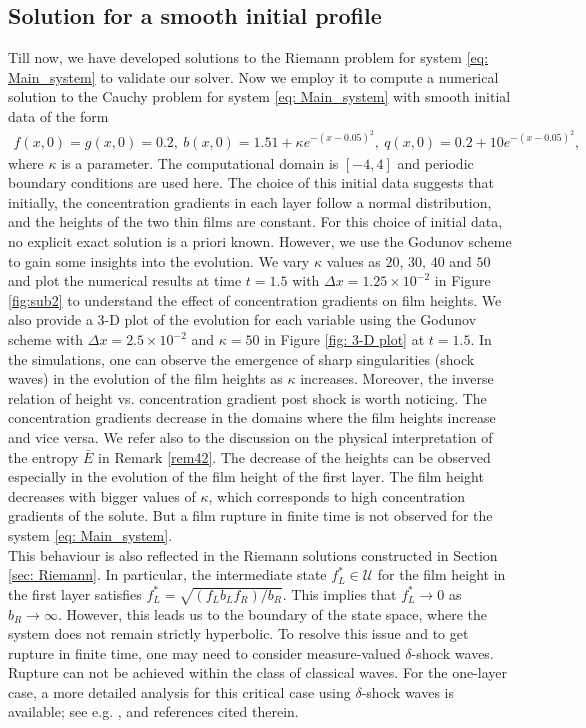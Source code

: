 \documentclass[11pt]{article}
\numberwithin{equation}{section}
\newtheorem{counter example}[theorem]{Counter Example}
\begin{document}
{\subsection{Solution for a smooth initial profile}
Till now, we have developed solutions to the Riemann problem for system \eqref{eq: Main_system} to validate our solver. Now we employ it to compute a numerical solution to the Cauchy problem for system \eqref{eq: Main_system} with smooth initial data of the form 
\begin{align*}
    f(x, 0)=g(x, 0)=0.2,~b(x, 0)=1.51+\kappa e^{-(x-0.05)^2},~q(x, 0)= 0.2+10e^{-(x-0.05)^2},
\end{align*}
where $\kappa$ is a parameter. 
The computational domain is $[-4, 4]$ and periodic boundary conditions are used here. The choice of this initial data suggests that initially, the concentration gradients in each layer follow a normal distribution, and the heights of the two thin films are constant. For this choice of initial data, no explicit exact solution is a priori known. However, we use the Godunov scheme to gain some insights into the evolution.  We vary $\kappa$ values as $20, \,30, \,40$ and $50$ and plot the numerical results at time $t=1.5$ with $\Delta x= 1.25\times 10^{-2}$ in Figure \ref{fig:sub2} to understand the effect of concentration gradients on film heights. We also provide a 3-D plot of the evolution for each variable using the Godunov scheme with $\Delta x= 2.5\times 10^{-2}$ and $\kappa=50$ in Figure \ref{fig: 3-D plot} at $t=1.5$. In the simulations, one can observe the emergence of sharp singularities (shock waves) in the evolution of the film heights as $\kappa$ increases.  Moreover, the inverse relation of height vs.$\!$ concentration gradient post shock is worth noticing. The concentration gradients decrease in the domains where the film heights increase and vice versa.  We refer also to the   discussion on the physical interpretation of the entropy $\bar E$ in Remark \ref{rem42}. 
The decrease of the heights can be observed especially in the evolution of the film height of the first layer.  The film height decreases  with bigger values of $\kappa$, which corresponds to high concentration gradients of the solute.  But a film rupture  in finite time is not observed for the system \eqref{eq: Main_system}.\\
This behaviour is also reflected in the Riemann solutions constructed in Section \ref{sec: Riemann}. In particular, the intermediate state $f_L^* \in \mathcal U$ for the film height in the first layer satisfies $f_L^*=\sqrt{({f_Lb_Lf_R})/{b_R}}$. This implies that $f_L^*\rightarrow 0$ as $b_R\rightarrow \infty$. However, this leads us to the boundary of the state space, where the system does not remain strictly hyperbolic.  To resolve this issue and to get rupture in finite time, one may need to consider measure-valued $\delta$-shock waves. Rupture can not be achieved within the class of classical waves. For the one-layer case, a more detailed analysis for this critical case using  $\delta$-shock waves is available; see e.g. \cite{barthwal2023construction, barthwal2025existence, sen2020delta}, and references cited therein.  
}
\end{document}
